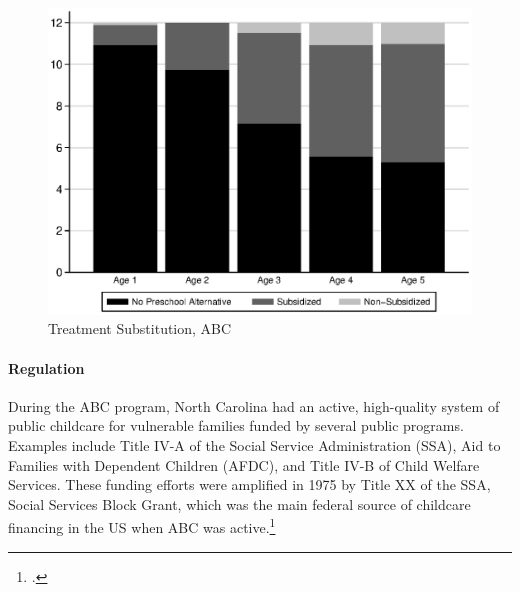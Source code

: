 \begin{appendices}
\begin{center}
	\begin{figure}[H]
		\caption{Treatment Substitution, ABC} \label{fig:ccabc}
		\centering
		\includegraphics[width=.9\columnwidth]{output/blackwhite_CCnumber.eps}
	\end{figure}
\end{center}

\paragraph{Regulation}

\noindent During the ABC program, North Carolina had an active, high-quality system of public childcare for vulnerable families funded by several public programs. Examples include Title IV-A of the Social Service Administration (SSA), Aid to Families with Dependent Children (AFDC), and Title IV-B of Child Welfare Services. These funding efforts were amplified in 1975 by Title XX of the SSA, Social Services Block Grant, which was the main federal source of childcare financing in the US when ABC was active.\footnote{\citet{Robins_1988_Federal-Child-Care}.}\\


\end{appendices}
